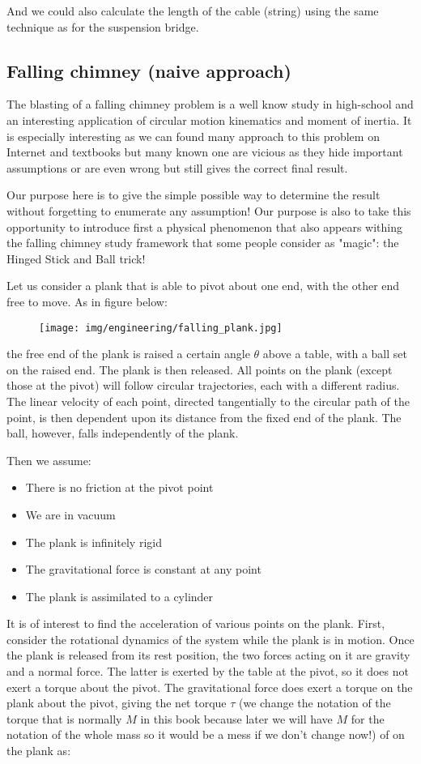 	And we could also calculate the length of the cable (string) using the same technique as for the suspension bridge.
	
	\pagebreak
	\subsection{Falling chimney (naive approach)}
	The blasting of a falling chimney problem is a well know study in high-school and an interesting application of circular motion kinematics and moment of inertia. It is especially interesting as we can found many approach to this problem on Internet and textbooks but many known one are vicious as they hide important assumptions or are even wrong but still gives the correct final result.
	
	Our purpose here is to give the simple possible way to determine the result without forgetting to enumerate any assumption! Our purpose is also to take this opportunity to introduce first a physical phenomenon that also appears withing the falling chimney study framework that some people consider as "magic": the Hinged Stick and Ball trick!
	
	Let us consider a plank that is able to pivot about one end, with the other end free to move. As in figure below:
	\begin{figure}[H]
		\centering
		\texttt{[image: img/engineering/falling\_plank.jpg]}
	\end{figure}
	 the free end of the plank is raised a certain angle $\theta$ above a table, with a ball set on the raised end. The plank is then released. All points on the plank (except those at the pivot) will follow circular trajectories, each with a different radius. The linear velocity of each point, directed tangentially to the circular path of the point, is then dependent upon its distance from the fixed end of the plank. The ball, however, falls independently of the plank.
	 
	Then we assume:
	\begin{itemize}
		\item There is no friction at the pivot point
		\item We are in vacuum
		\item The plank is infinitely rigid
		\item The gravitational force is constant at any point
		\item The plank is assimilated to a cylinder
	\end{itemize}

	It is of interest to find the acceleration of various points on the plank. First, consider the rotational dynamics of the system while the plank is in motion. Once the plank is released from its rest position, the two forces acting on it are gravity and a normal force. The latter is exerted by the table at the pivot, so it does not exert a torque about the pivot. The gravitational force does exert a torque on the plank about the pivot, giving the net torque $\tau$ (we change the notation of the torque that is normally $M$ in this book because later we will have $M$ for the notation of the whole mass so it would be a mess if we don't change now!) of on the plank as:
		
